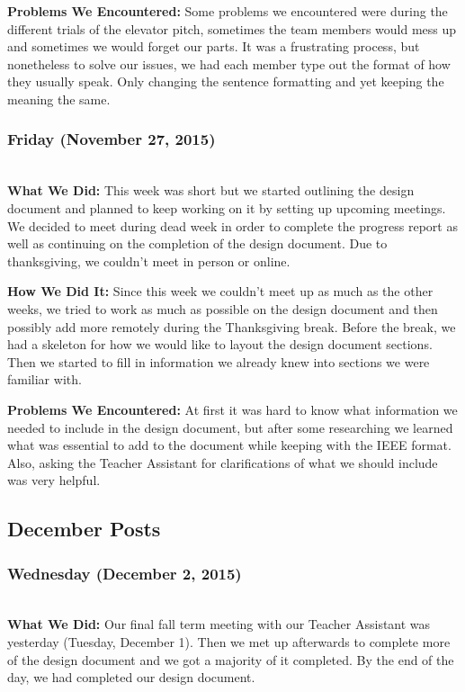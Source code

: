 \documentclass[onecolumn]{IEEEtran}
\begin{document}
    \textbf{Problems We Encountered: } 
    Some problems we encountered were during the different trials of the elevator pitch, sometimes the team members would mess up and sometimes we would forget our parts. It was a frustrating process, but nonetheless to solve our issues, we had each member type out the format of how they usually speak. Only changing the sentence formatting and yet keeping the meaning the same.  

\subsubsection{Friday (November 27, 2015)} \hspace*{\fill} \\  
    \textbf{What We Did: }
    This week was short but we started outlining the design document and planned to keep working on it by setting up upcoming meetings. We decided to meet during dead week in order to complete the progress report as well as continuing on the completion of the design document. Due to thanksgiving, we couldn't meet in person or online.  
    
    \textbf{How We Did It: } 
    Since this week we couldn't meet up as much as the other weeks, we tried to work as much as possible on the design document and then possibly add more remotely during the Thanksgiving break. Before the break, we had a skeleton for how we would like to layout the design document sections. Then we started to fill in information we already knew into sections we were familiar with.  
    
    \textbf{Problems We Encountered: } 
    At first it was hard to know what information we needed to include in the design document, but after some researching we learned what was essential to add to the document while keeping with the IEEE format. Also, asking the Teacher Assistant for clarifications of what we should include was very helpful.  

\subsection{December Posts}
\subsubsection{Wednesday (December 2, 2015)} \hspace*{\fill} \\  
    \textbf{What We Did: }
    Our final fall term meeting with our Teacher Assistant was yesterday (Tuesday, December 1). Then we met up afterwards to complete more of the design document and we got a majority of it completed. By the end of the day, we had completed our design document.  
    
\end{document}
